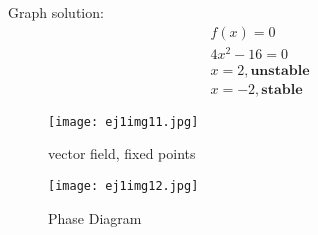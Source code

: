 \documentclass[a4paper,10pt]{article}
\begin{document}
\begin{enumerate}
\begin{enumerate}
			Graph solution:
			\begin{equation}
			    \begin{aligned}
    			    f(x)=0\\
    			    4x^2-16=0\\
    			    x=2, \textbf{unstable}\\
    			    x=-2, \textbf{stable}
    			 \end{aligned}
			\end{equation}
			\begin{figure}[h]
                \centering
                \texttt{[image: ej1img11.jpg]}
                \caption{vector field, fixed points}
                \label{fig:mesh1}
            \end{figure}
            
            \begin{figure}[h]
                \centering
                \texttt{[image: ej1img12.jpg]}
                \caption{Phase Diagram}
                \label{fig:mesh1}
            \end{figure}
            

\end{enumerate}
\end{enumerate}
\end{document}

